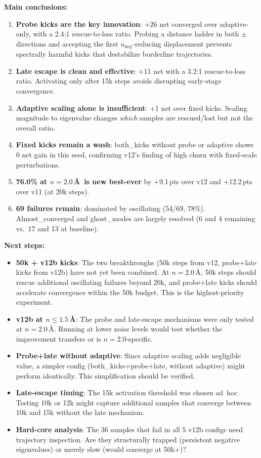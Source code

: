 \documentclass[11pt,a4paper]{article}
\theoremstyle{definition}
\begin{document}
\textbf{Main conclusions:}
\begin{enumerate}[nosep]
  \item \textbf{Probe kicks are the key innovation}: $+$26 net converged
    over adaptive-only, with a 2.4:1 rescue-to-loss ratio.  Probing a
    distance ladder in both $\pm$ directions and accepting the first
    $n_\text{neg}$-reducing displacement prevents spectrally harmful
    kicks that destabilize borderline trajectories.
  \item \textbf{Late escape is clean and effective}: $+$11 net with a
    3.2:1 rescue-to-loss ratio.  Activating only after 15k steps avoids
    disrupting early-stage convergence.
  \item \textbf{Adaptive scaling alone is insufficient}: $+$1 net over
    fixed kicks.  Scaling magnitude to eigenvalue changes \emph{which}
    samples are rescued/lost but not the overall ratio.
  \item \textbf{Fixed kicks remain a wash}: both\_kicks without
    probe or adaptive shows 0 net gain in this seed, confirming v12's
    finding of high churn with fixed-scale perturbations.
  \item \textbf{76.0\% at $n=2.0$\,\AA\ is new best-ever} by
    $+$9.1\,pts over v12 and $+$12.2\,pts over v11 (at 20k steps).
  \item \textbf{69 failures remain}: dominated by oscillating (54/69,
    78\%).  Almost\_converged and ghost\_modes are largely resolved
    (6 and 4 remaining vs.\ 17 and 13 at baseline).
\end{enumerate}

\textbf{Next steps:}
\begin{itemize}[nosep]
  \item \textbf{50k + v12b kicks}: The two breakthroughs (50k steps from
    v12, probe+late kicks from v12b) have not yet been combined.  At
    $n=2.0$\,\AA, 50k steps should rescue additional oscillating failures
    beyond 20k, and probe+late kicks should accelerate convergence within
    the 50k budget.  This is the highest-priority experiment.
  \item \textbf{v12b at $n \leq 1.5$\,\AA}: The probe and late-escape
    mechanisms were only tested at $n=2.0$\,\AA.  Running at lower noise
    levels would test whether the improvement transfers or is
    $n=2.0$-specific.
  \item \textbf{Probe+late without adaptive}: Since adaptive scaling adds
    negligible value, a simpler config (both\_kicks+probe+late, without
    adaptive) might perform identically.  This simplification should be
    verified.
  \item \textbf{Late-escape timing}: The 15k activation threshold was
    chosen ad~hoc.  Testing 10k or 12k might capture additional samples
    that converge between 10k and 15k without the late mechanism.
  \item \textbf{Hard-core analysis}: The 36 samples that fail in all 5
    v12b configs need trajectory inspection.  Are they structurally
    trapped (persistent negative eigenvalues) or merely slow (would
    converge at 50k+)?
\end{itemize}
\end{document}
